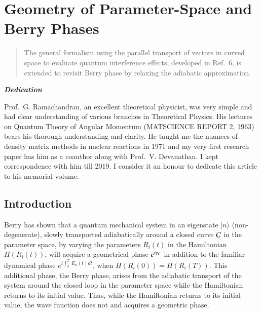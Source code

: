 \chapter[Geometry of Parameter-Space and Berry Phases]{Geometry of Parameter-Space and Berry Phases}\label{chap11}



\begin{abstract}
The general formalism using the parallel transport of vectors in curved space to evaluate quantum interference effects,  developed in Ref.\ 6, is extended to revisit Berry phase by relaxing the adiabatic approximation. 
\end{abstract}
\bigskip

\centerline{\textit{\textbf{Dedication}}}
\smallskip

Prof.\ G. Ramachandran, an excellent theoretical physicist, was very simple and had clear understanding of  various branches in Theoretical Physics. His lectures on Quantum Theory of Angular Momentum  (MATSCIENCE REPORT 2, 1963) bears his  thorough understanding and clarity. He taught me the nuances of density matrix methods in nuclear  reactions in 1971 and my very first research paper has him as a coauthor along with Prof.\ V. Devanathan. I kept correspondence with him till 2019. I consider it an honour to dedicate this  article to his memorial volume.

\section{Introduction}\label{chap11-sec1}

Berry \cite{chap11-key1} has shown that a quantum mechanical system in an eigenstate $|n\rangle$ (non-degenerate), slowly transported  adiabatically around a closed curve ${\cal{C}}$ in the parameter space, by varying the parameters $R_i(t)$ in the  Hamiltonian $H(R_i(t))$, will acquire a geometrical phase $e^{i{\gamma}_{\cal{C}}}$ in addition to the familiar dynamical  phase $e^{i\int_0^T\ E_n(t)dt}$, when $H(R_i(0))=H(R_i(T))$. This additional phase, the Berry phase, arises from the  adiabatic transport of the system around the closed loop in the parameter space while the Hamiltonian returns to its  initial value. Thus, while the Hamiltonian returns to its initial value, the wave function does not and  acquires a geometric phase. 

